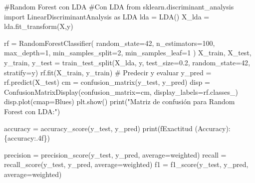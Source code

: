 \documentclass[
  letterpaper,
  DIV=11,
  numbers=noendperiod]{scrartcl}
\newenvironment{Shaded}{\begin{snugshade}}{\end{snugshade}}
\newcommand{\BuiltInTok}[1]{\textcolor[rgb]{0.00,0.23,0.31}{#1}}
\newcommand{\CommentTok}[1]{\textcolor[rgb]{0.37,0.37,0.37}{#1}}
\newcommand{\DecValTok}[1]{\textcolor[rgb]{0.68,0.00,0.00}{#1}}
\newcommand{\FloatTok}[1]{\textcolor[rgb]{0.68,0.00,0.00}{#1}}
\newcommand{\ImportTok}[1]{\textcolor[rgb]{0.00,0.46,0.62}{#1}}
\newcommand{\NormalTok}[1]{\textcolor[rgb]{0.00,0.23,0.31}{#1}}
\newcommand{\OperatorTok}[1]{\textcolor[rgb]{0.37,0.37,0.37}{#1}}
\newcommand{\SpecialCharTok}[1]{\textcolor[rgb]{0.37,0.37,0.37}{#1}}
\newcommand{\SpecialStringTok}[1]{\textcolor[rgb]{0.13,0.47,0.30}{#1}}
\newcommand{\StringTok}[1]{\textcolor[rgb]{0.13,0.47,0.30}{#1}}
\begin{document}
\begin{Shaded}
\begin{Highlighting}[]
\CommentTok{\#Random Forest con LDA}
\CommentTok{\#Con LDA}
\ImportTok{from}\NormalTok{ sklearn.discriminant\_analysis }\ImportTok{import}\NormalTok{ LinearDiscriminantAnalysis }\ImportTok{as}\NormalTok{ LDA}
\NormalTok{lda }\OperatorTok{=}\NormalTok{ LDA()}
\NormalTok{X\_lda }\OperatorTok{=}\NormalTok{ lda.fit\_transform(X,y)}


\NormalTok{rf }\OperatorTok{=}\NormalTok{ RandomForestClassifier(}
\NormalTok{  random\_state}\OperatorTok{=}\DecValTok{42}\NormalTok{,}
\NormalTok{  n\_estimators}\OperatorTok{=}\DecValTok{100}\NormalTok{,}
\NormalTok{  max\_depth}\OperatorTok{=}\DecValTok{1}\NormalTok{,}
\NormalTok{  min\_samples\_split}\OperatorTok{=}\DecValTok{2}\NormalTok{,}
\NormalTok{  min\_samples\_leaf}\OperatorTok{=}\DecValTok{1}
\NormalTok{)}
\NormalTok{X\_train, X\_test, y\_train, y\_test }\OperatorTok{=}
\NormalTok{  train\_test\_split(X\_lda, y, test\_size}\OperatorTok{=}\FloatTok{0.2}\NormalTok{, random\_state}\OperatorTok{=}\DecValTok{42}\NormalTok{, stratify}\OperatorTok{=}\NormalTok{y)}
\NormalTok{rf.fit(X\_train, y\_train)}
\CommentTok{\# Predecir y evaluar}
\NormalTok{y\_pred }\OperatorTok{=}\NormalTok{ rf.predict(X\_test)}
\NormalTok{cm }\OperatorTok{=}\NormalTok{ confusion\_matrix(y\_test, y\_pred)}
\NormalTok{disp }\OperatorTok{=}\NormalTok{ ConfusionMatrixDisplay(confusion\_matrix}\OperatorTok{=}\NormalTok{cm, display\_labels}\OperatorTok{=}\NormalTok{rf.classes\_)}
\NormalTok{disp.plot(cmap}\OperatorTok{=}\StringTok{\textquotesingle{}Blues\textquotesingle{}}\NormalTok{)}
\NormalTok{plt.show()}
\BuiltInTok{print}\NormalTok{(}\StringTok{"Matriz de confusión para Random Forest con LDA:"}\NormalTok{)}

\NormalTok{accuracy }\OperatorTok{=}\NormalTok{ accuracy\_score(y\_test, y\_pred)}
\BuiltInTok{print}\NormalTok{(}\SpecialStringTok{f\textquotesingle{}Exactitud (Accuracy): }\SpecialCharTok{\{}\NormalTok{accuracy}\SpecialCharTok{:.4f\}}\SpecialStringTok{\textquotesingle{}}\NormalTok{)}

\NormalTok{precision }\OperatorTok{=}\NormalTok{ precision\_score(y\_test, y\_pred, average}\OperatorTok{=}\StringTok{\textquotesingle{}weighted\textquotesingle{}}\NormalTok{)}
\NormalTok{recall }\OperatorTok{=}\NormalTok{ recall\_score(y\_test, y\_pred, average}\OperatorTok{=}\StringTok{\textquotesingle{}weighted\textquotesingle{}}\NormalTok{)}
\NormalTok{f1 }\OperatorTok{=}\NormalTok{ f1\_score(y\_test, y\_pred, average}\OperatorTok{=}\StringTok{\textquotesingle{}weighted\textquotesingle{}}\NormalTok{)}


\end{Highlighting}
\end{Shaded}
\end{document}
